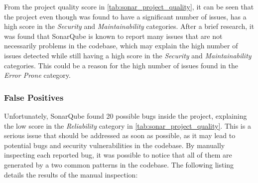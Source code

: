 \noindent From the project quality score in \autoref{tab:sonar_project_quality}, it can be seen that the project even though was found to have a significant number of issues,  has a high score in the \textit{Security} and \textit{Maintainability} categories. After a brief research, it was found that SonarQube is known to report many issues that are not necessarily problems in the codebase, which may explain the high number of issues detected while still having a high score in the \textit{Security} and \textit{Maintainability} categories. This could be a reason for the high number of issues found in the \textit{Error Prone} category.

\subsubsection{False Positives}

Unfortunately, SonarQube found 20 possible bugs inside the project, explaining the low score in the \textit{Reliability} category in \autoref{tab:sonar_project_quality}. This is a serious issue that should be addressed as soon as possible, as it may lead to potential bugs and security vulnerabilities in the codebase. By manually inspecting each reported bug, it was possible to notice that all of them are generated by a two common patterns in the codebase. The following listing details the results of the manual inspection:

